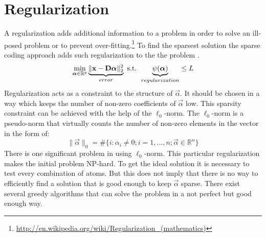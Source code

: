 \section{Regularization}
A regularization adds additional information to a problem in order to solve an
ill-posed problem or to prevent over-fitting.\footnote{\url{
http://en.wikipedia.org/wiki/Regularization_(mathematics)}}
To find the sparsest solution the sparse coding approach adds such
regularization to the the problem . 
\begin{equation}
\min_{\boldsymbol{\mathrm{\alpha}}\in\mathbb{R}^{p}}
\underbrace{\lVert \boldsymbol{\mathrm{x}} -
\boldsymbol{\mathrm{D}}\boldsymbol{\mathrm{\alpha}}\rVert^{2}_{2}}_{error} \text{ s.t. }
\underbrace{\psi(\boldsymbol{\mathrm{\alpha}})}_{regularization}\leq L \label{eq:problem2}
\end{equation}
Regularization acts as a constraint to the structure of $\vec{\alpha}$. It
should be chosen in a way which keeps the number of non-zero coefficients of
$\vec{\alpha}$ low. 
This sparsity constraint can be achieved with the help of
the $\ell_0$-norm. The $\ell_0$-norm is a pseudo-norm that virtually counts the
number of non-zero elements in the vector in the form of:
\begin{equation*}
\lVert \vec{\alpha} \rVert_{0} = \#\{i:\alpha_i \neq 
0; i=1,...,n; \vec{\alpha}\in\mathbb{R}^n\} 
\end{equation*}
There is one significant problem in using $\ell_0$-norm. This particular
regularization makes the initial problem  NP-hard. To get
the ideal solution it is necessary to test every combination of atoms. But this
does not imply that there is no way to efficiently find a solution that is good
enough to keep $\vec{\alpha}$ sparse. There exist several greedy algorithms that
can solve the problem in a not perfect but good enough way. 

